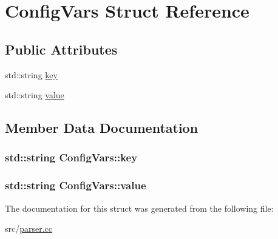 \hypertarget{struct_config_vars}{}\section{Config\+Vars Struct Reference}
\label{struct_config_vars}
\subsection*{Public Attributes}
\begin{DoxyCompactItemize}
\item 
std\+::string \hyperlink{struct_config_vars_a5852a3ebe384ed6504ea8c34645351ac}{key}
\item 
std\+::string \hyperlink{struct_config_vars_ace564a16ca27562c01cf270320170c6e}{value}
\end{DoxyCompactItemize}


\subsection{Member Data Documentation}
\subsubsection[{\texorpdfstring{key}{key}}]{\setlength{\rightskip}{0pt plus 5cm}std\+::string Config\+Vars\+::key}\hypertarget{struct_config_vars_a5852a3ebe384ed6504ea8c34645351ac}{}\label{struct_config_vars_a5852a3ebe384ed6504ea8c34645351ac}
\subsubsection[{\texorpdfstring{value}{value}}]{\setlength{\rightskip}{0pt plus 5cm}std\+::string Config\+Vars\+::value}\hypertarget{struct_config_vars_ace564a16ca27562c01cf270320170c6e}{}\label{struct_config_vars_ace564a16ca27562c01cf270320170c6e}


The documentation for this struct was generated from the following file\+:\begin{DoxyCompactItemize}
\item 
src/\hyperlink{parser_8cc}{parser.\+cc}\end{DoxyCompactItemize}
